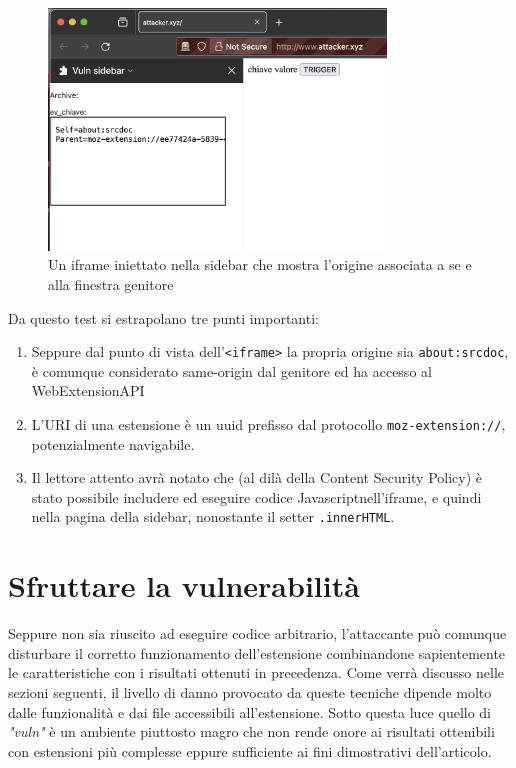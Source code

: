 \documentclass{sapthesis}
\newcommand{\code}[1]{\texttt{#1}}
\newcommand{\attr}[1]{\code{.#1}}
\newcommand{\vuln}{\textit{"vuln"}}
\newcommand{\JS}{Javascript}
\newcommand{\tagHTML}[1]{\code{<#1>}}
\newcommand{\iframe}{\tagHTML{iframe}}
\begin{document}
            \begin{figure}[ht]
                \centering
                \includegraphics[width=0.8\textwidth]{sidebar-iframe-test.png}
                \caption{Un iframe iniettato nella sidebar che mostra l'origine associata a se e alla finestra genitore}
                \label{fig:sidebar-iframe-example}
            \end{figure}

            Da questo test si estrapolano tre punti importanti:
            \begin{enumerate}
                \item Seppure dal punto di vista dell'\iframe{} la propria origine sia \code{about:srcdoc}, è comunque
                        considerato same-origin dal genitore ed ha accesso al WebExtensionAPI

                \item L'URI di una estensione è un uuid prefisso dal protocollo \code{moz-extension://}, potenzialmente
                        navigabile.

                \item Il lettore attento avrà notato che (al dilà della Content Security Policy) è stato possibile
                        includere ed eseguire codice \JS nell'iframe, e quindi nella pagina della sidebar, nonostante 
                        il setter \attr{innerHTML}.
            \end{enumerate}
            
    
    \section{Sfruttare la vulnerabilità}
    \label{sec:attaccando-vuln-risultati}
        Seppure non sia riuscito ad eseguire codice arbitrario, l'attaccante può comunque disturbare il corretto
        funzionamento dell'estensione combinandone sapientemente le caratteristiche con i risultati
        ottenuti in precedenza. Come verrà discusso nelle sezioni seguenti, il livello di danno provocato da queste 
        tecniche dipende molto dalle funzionalità e dai file accessibili all'estensione. Sotto questa luce 
        quello di \vuln{} è un ambiente piuttosto magro che non rende onore ai risultati ottenibili con estensioni più 
        complesse eppure sufficiente ai fini dimostrativi dell'articolo.
\end{document}
